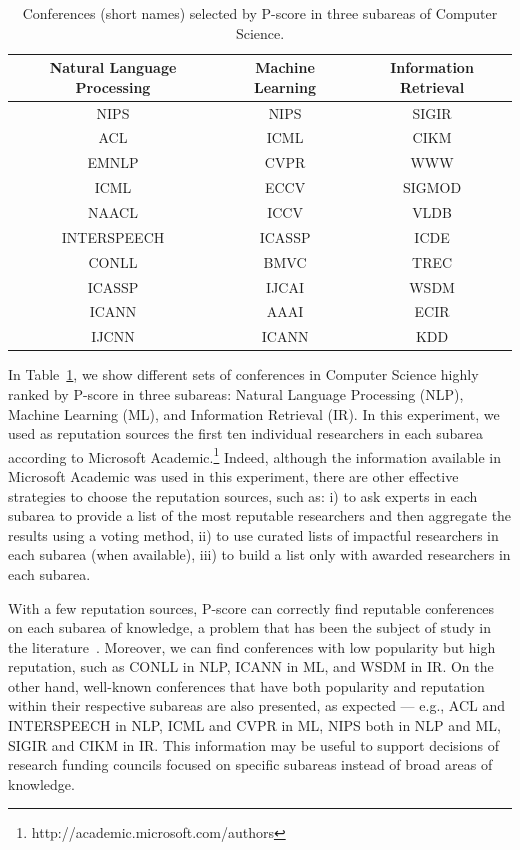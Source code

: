 \documentclass[notitlepage]{svjour3}
\begin{document}
\begin{table}[ht]
  \small
  \centering
  \begin{tabular}{c c c } 
  \toprule
  Natural Language Processing  & Machine Learning & Information Retrieval  \\ 
  \midrule
  NIPS & NIPS & SIGIR \\
  ACL  & ICML & CIKM \\
  EMNLP & CVPR & WWW \\
  ICML  & ECCV & SIGMOD \\
  NAACL & ICCV & VLDB \\
  INTERSPEECH & ICASSP & ICDE \\
  CONLL  & BMVC & TREC \\
  ICASSP  & IJCAI & WSDM \\
  ICANN  & AAAI & ECIR \\
  IJCNN  & ICANN & KDD \\
  \bottomrule
  \end{tabular}
  \caption{Conferences (short names) selected by P-score in three subareas of Computer Science.}
  \label{tab:subareas}
\end{table}

In Table~\ref{tab:subareas}, we show different sets of conferences in Computer Science highly ranked by P-score in three subareas: Natural Language Processing (NLP), Machine Learning (ML), and Information Retrieval (IR). In this experiment, we used as reputation sources the first ten individual researchers in each subarea according to Microsoft Academic.\footnote{http://academic.microsoft.com/authors} %
Indeed, although the information available in Microsoft Academic was used in this experiment, there are other effective strategies to choose the reputation sources, such as: i) to ask experts in each subarea to provide a list of the most reputable researchers and then aggregate the results using a voting method, ii) to use curated lists of impactful researchers in each subarea (when available), iii) to build a list only with awarded researchers in each subarea.

With a few reputation sources, P-score can correctly find reputable conferences on each subarea of knowledge, a problem that has been the subject of study in the literature~\cite{wainer13,leydesdorff13,waltman13}. Moreover, we can find conferences with low popularity but high reputation, such as CONLL in NLP, ICANN in ML, and WSDM in IR. On the other hand, well-known conferences that have both popularity and reputation within their respective subareas are also presented, as expected --- e.g., ACL and INTERSPEECH in NLP, ICML and CVPR in ML, NIPS both in NLP and ML, SIGIR and CIKM in IR. This information may be useful to support decisions of research funding councils focused on specific subareas instead of broad areas of knowledge. 
\end{document}
